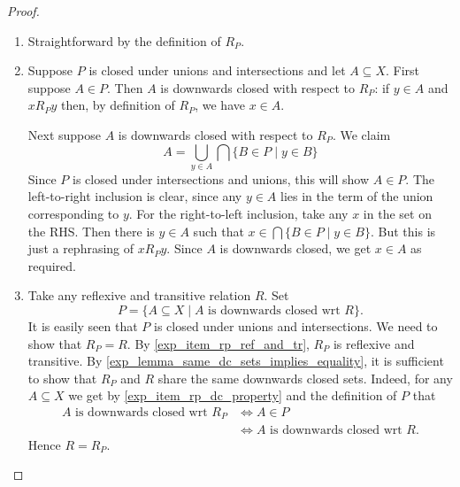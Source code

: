 \begin{proof}\leavevmode
    \begin{enumerate}
        \item Straightforward by the definition of $R_P$.

        \item Suppose $P$ is closed under unions and intersections and let $A
              \subseteq X$.  First suppose $A \in P$. Then $A$ is downwards
              closed with respect to $R_P$: if $y \in A$ and $x{R_P}y$ then, by
              definition of $R_P$, we have $x \in A$.

              Next suppose $A$ is downwards closed with respect to $R_P$. We
              claim \[ A = \bigcup_{y \in A}\bigcap\{B \in P \mid y \in B\} \]
              Since $P$ is closed under intersections and unions, this will
              show $A \in P$. The left-to-right inclusion is clear, since any
              $y \in A$ lies in the term of the union corresponding to $y$. For
              the right-to-left inclusion, take any $x$ in the set on the RHS.
              Then there is $y \in A$ such that $x \in \bigcap\{B \in P \mid y
              \in B\}$. But this is just a rephrasing of $x{R_P}y$. Since $A$
              is downwards closed, we get $x \in A$ as required.

        \item Take any reflexive and transitive relation $R$. Set
              \[
                  P
                  =
                  \{A \subseteq X \mid A \text{ is downwards closed wrt } R\}.
                \]
              It is easily seen that $P$ is closed under unions and
              intersections. We need to show that $R_P = R$.
              By \cref{exp_item_rp_ref_and_tr}, $R_P$ is reflexive and
              transitive.  By \cref{exp_lemma_same_dc_sets_implies_equality}, it is
              sufficient to show that $R_P$ and $R$ share the same downwards
              closed sets.  Indeed, for any $A \subseteq X$ we get by
              \cref{exp_item_rp_dc_property} and the definition of $P$ that
              \[
              \begin{aligned}
                  A \text{ is downwards closed wrt } R_P
                  &\iff A \in P \\
                  &\iff A \text{ is downwards closed wrt } R.
              \end{aligned}
              \]
              Hence $R = R_P$.
    \end{enumerate}
\end{proof}

